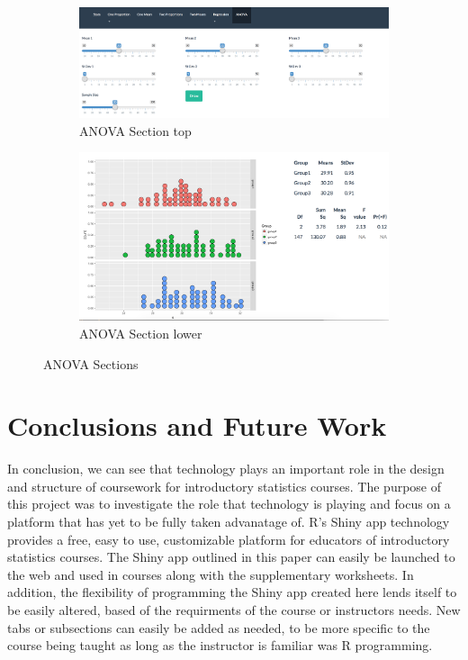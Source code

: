 \documentclass[11pt]{book}
\begin{document}
\begin{figure}
        \centering

        \begin{subfigure}[b]{0.75\textwidth}
                \includegraphics[width=\textwidth]{ANOVAUP.png}
                \caption{ANOVA Section top }
                \label{fig:ANOVAUP}
        \end{subfigure}%

        \begin{subfigure}[b]{0.75\textwidth}
                \includegraphics[width=\textwidth]{ANOVALOW.png}
                \caption{ANOVA Section lower} 
                \label{fig:ANOVALOW}
        \end{subfigure}

\caption {ANOVA Sections}
\end{figure}


\section{Conclusions and Future Work}
In conclusion, we can see that technology plays an important role in the design and structure of coursework for introductory statistics courses. The purpose of this project was to investigate the role that technology is playing and focus on a platform that has yet to be fully taken advanatage of.  R's Shiny app technology provides a free, easy to use, customizable platform for educators of introductory statistics courses. The Shiny app outlined in this paper can easily be launched to the web and used in courses along with the supplementary worksheets. In addition, the flexibility of programming the Shiny app created here lends itself to be easily altered, based of the requirments of the course or instructors needs. New tabs or subsections can easily be added as needed, to be more specific to the course being taught as long as the instructor is familiar was R programming. 
\end{document}
